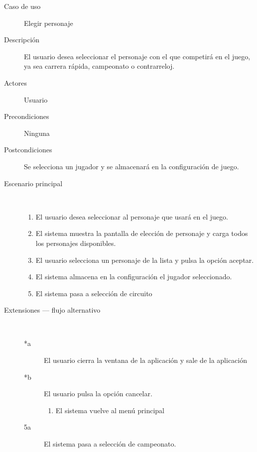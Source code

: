 \begin{description}
    \item[Caso de uso] Elegir personaje
    
    \item[Descripción] El usuario desea seleccionar el personaje con el que competirá en el juego, ya sea carrera rápida, 
    campeonato o contrarreloj.
    
    \item[Actores] Usuario
    
    \item[Precondiciones] Ninguna
    
    \item[Postcondiciones] Se selecciona un jugador y se almacenará en la configuración de juego.
    
    \item[Escenario principal] $\quad$
        \begin{enumerate}
            \item El usuario desea seleccionar al personaje que usará en el juego.
            \item El sistema muestra la pantalla de elección de personaje y carga todos los personajes disponibles.
            \item El usuario selecciona un personaje de la lista y pulsa la opción aceptar.
            \item El sistema almacena en la configuración el jugador seleccionado.
            \item El sistema pasa a selección de circuito%
        \end{enumerate}
    \item[Extensiones --- flujo alternativo] $\quad$
        \begin{description}
            \item[*a ] El usuario cierra la ventana de la aplicación y sale de la aplicación
            
            \item[*b ] El usuario pulsa la opción cancelar.
            \begin{enumerate}
                \item El sistema vuelve al menú principal
            \end{enumerate}
            
            \item [5a ] El sistema pasa a selección de campeonato.
            
        \end{description}
\end{description}

